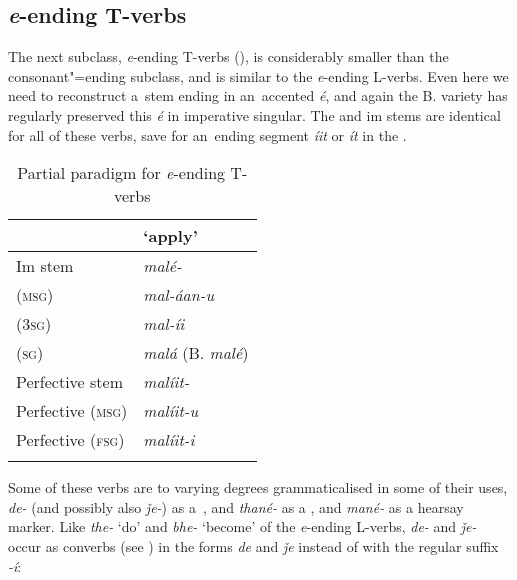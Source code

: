 \subsection{\textit{e}-ending T-verbs}
\label{subsec:8-3-6}


The next subclass, \textit{e}-ending T-verbs (), is considerably smaller than the consonant"=ending subclass, and is similar to the \textit{e}-ending L-verbs. Even here we need to reconstruct a~stem ending in an~accented \textit{é}, and again the B. variety has regularly preserved this \textit{é} in imperative singular. The  and im stems are identical for all of these verbs, save for an~ending segment \textit{íit} or \textit{ít} in the .


\begin{table}[ht]
\caption{Partial paradigm for \textit{e}-ending T-verbs}
\begin{tabularx}{.75\textwidth}{ Q Q }
\lsptoprule
&
`apply'\\\hline
Im stem &
\textit{malé-}\\
 (\textsc{msg}) &
\textit{mal-áan-u} \\
 (\textsc{3sg}) &
\textit{mal-íi} \\
 (\textsc{sg}) &
\textit{malá} (B. \textit{malé})\\
Perfective stem &
\textit{malíit-} \\
Perfective (\textsc{msg}) &
\textit{malíit-u} \\
Perfective (\textsc{fsg}) &
\textit{malíit-i} \\\lspbottomrule
\end{tabularx}
\label{tab:8-9}
\end{table}


Some of these verbs are to varying degrees grammaticalised in some of their uses, \textit{de-} (and possibly also \textit{ǰe-}) as a~, and \textit{thané-} as a , and \textit{mané-} as a hearsay marker. Like \textit{the-} `do' and \textit{bhe-} `become' of the \textit{e}-ending L-verbs, \textit{de-} and \textit{ǰe-} occur as converbs (see ) in the forms \textit{de} and \textit{ǰe} instead of with the regular suffix \textit{-í}:


